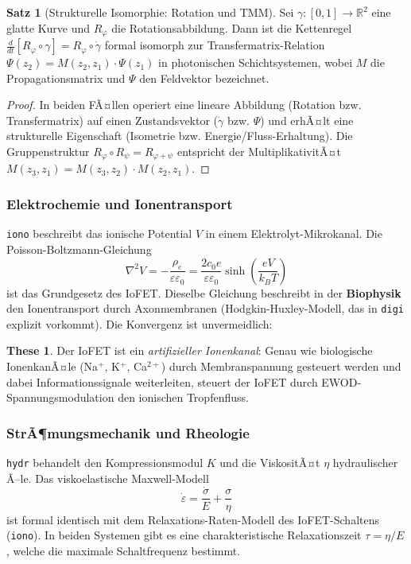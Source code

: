 ﻿\documentclass[a4paper,12pt]{scrreprt}
\theoremstyle{definition}
\newtheorem{satz}{Satz}[section]
\newtheorem{these}{These}[section]
\begin{document}
\begin{satz}[Strukturelle Isomorphie: Rotation und TMM]
  Sei $\gamma: [0,1] \to \mathbb{R}^2$ eine glatte Kurve und $R_\varphi$ die
  Rotationsabbildung. Dann ist die Kettenregel $\frac{d}{dt}[R_\varphi \circ \gamma]
  = R_\varphi \circ \dot{\gamma}$ formal isomorph zur Transfermatrix-Relation
  $\Psi(z_2) = M(z_2, z_1) \cdot \Psi(z_1)$ in photonischen Schichtsystemen,
  wobei $M$ die Propagationsmatrix und $\Psi$ den Feldvektor bezeichnet.
\end{satz}

\begin{proof}
  In beiden FÃ¤llen operiert eine lineare Abbildung (Rotation bzw. Transfermatrix)
  auf einen Zustandsvektor ($\dot\gamma$ bzw. $\Psi$) und erhÃ¤lt eine strukturelle
  Eigenschaft (Isometrie bzw. Energie/Fluss-Erhaltung). Die Gruppenstruktur
  $R_\varphi \circ R_\psi = R_{\varphi+\psi}$ entspricht der MultiplikativitÃ¤t
  $M(z_3, z_1) = M(z_3, z_2) \cdot M(z_2, z_1)$.
\end{proof}

\subsubsection{Elektrochemie und Ionentransport}

\texttt{iono} beschreibt das ionische Potential $V$ in einem
Elektrolyt-Mikrokanal. Die Poisson-Boltzmann-Gleichung
\[
  \nabla^2 V = -\frac{\rho_e}{\varepsilon\varepsilon_0}
  = \frac{2c_0 e}{\varepsilon\varepsilon_0} \sinh\!\left(\frac{eV}{k_B T}\right)
\]
ist das Grundgesetz des IoFET. Dieselbe Gleichung beschreibt in der
\textbf{Biophysik} den Ionentransport durch Axonmembranen (Hodgkin-Huxley-Modell,
das in \texttt{digi} explizit vorkommt). Die Konvergenz ist unvermeidlich:

\begin{these}
  Der IoFET ist ein \emph{artifizieller Ionenkanal}: Genau wie biologische
  IonenkanÃ¤le (Na$^+$, K$^+$, Ca$^{2+}$) durch Membranspannung gesteuert
  werden und dabei Informationssignale weiterleiten, steuert der IoFET
  durch EWOD-Spannungsmodulation den ionischen Tropfenfluss.
\end{these}

\subsubsection{StrÃ¶mungsmechanik und Rheologie}

\texttt{hydr} behandelt den Kompressionsmodul $K$ und die ViskositÃ¤t $\eta$
hydraulischer Ã–le. Das viskoelastische Maxwell-Modell
\[
  \dot{\varepsilon} = \frac{\dot{\sigma}}{E} + \frac{\sigma}{\eta}
\]
ist formal identisch mit dem Relaxations-Raten-Modell des IoFET-Schaltens
(\texttt{iono}). In beiden Systemen gibt es eine charakteristische
Relaxationszeit $\tau = \eta/E$, welche die maximale Schaltfrequenz bestimmt.
\end{document}
